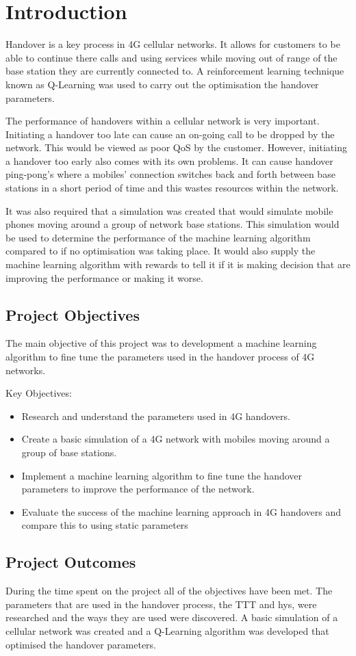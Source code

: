 \chapter{Introduction}
Handover is a key process in \ac{4G} cellular networks. It allows for customers to be able to continue there calls and using services while moving out of range of the base station they are currently connected to. A reinforcement learning technique known as Q-Learning was used to carry out the optimisation the handover parameters.

The performance of handovers within a cellular network is very important. Initiating a handover too late can cause an on-going call to be dropped by the network. This would be viewed as poor \ac{QoS} by the customer.  However, initiating a handover too early also comes with its own problems. It can cause handover ping-pong's where a mobiles' connection switches back and forth between base stations in a short period of time and this wastes resources within the network.  

It was also required that a simulation was created that would simulate mobile phones moving around a group of network base stations. This simulation would be used to determine the performance of the machine learning algorithm compared to if no optimisation was taking place. It would also supply the machine learning algorithm with rewards to tell it if it is making decision that are improving the performance or making it worse.
\section{Project Objectives}
The main objective of this project was to development a machine learning algorithm to fine tune the parameters used in the handover process of 4G networks.

Key Objectives:
\begin{itemize}
	\item Research and understand the parameters used in 4G handovers.
	\item Create a basic simulation of a 4G network with mobiles moving around a group of base stations.
	\item Implement a machine learning algorithm to fine tune the handover parameters to improve the performance of the network.
	\item Evaluate the success of the machine learning approach in 4G handovers and compare this to using static parameters
\end{itemize}
\section{Project Outcomes}
During the time spent on the project all of the objectives have been met. The parameters that are used in the handover process, the \ac{TTT} and \ac{hys}, were researched and the ways they are used were discovered. A basic simulation of a cellular network was created and a Q-Learning algorithm was developed that optimised the handover parameters.

